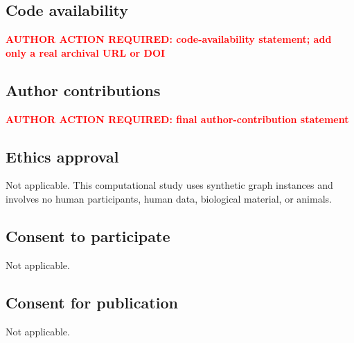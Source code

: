 \documentclass[pdflatex,sn-mathphys-num]{sn-jnl}
\theoremstyle{thmstyleone}
\theoremstyle{thmstylethree}
\theoremstyle{thmstyletwo}
\newcommand{\authoraction}[1]{\textcolor{red}{\textbf{AUTHOR ACTION REQUIRED: #1}}}
\begin{document}
\subsection*{Code availability}

\authoraction{code-availability statement; add only a real archival URL or DOI}

\subsection*{Author contributions}

\authoraction{final author-contribution statement}

\subsection*{Ethics approval}

Not applicable. This computational study uses synthetic graph instances and
involves no human participants, human data, biological material, or animals.

\subsection*{Consent to participate}

Not applicable.

\subsection*{Consent for publication}

Not applicable.


\end{document}
